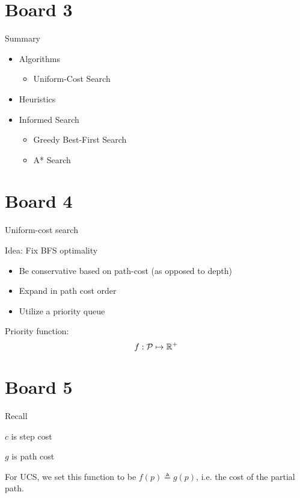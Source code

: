 \documentclass[10pt]{article}
\begin{document}
\section{Board 3}

Summary

\begin{itemize}
\item Algorithms
\begin{itemize}
\item Uniform-Cost Search 
\end{itemize}
\item Heuristics
\item Informed Search
  \begin{itemize}
  \item Greedy Best-First Search 
  \item A* Search
  \end{itemize}
\end{itemize}


\section{Board 4}

Uniform-cost search

Idea: Fix BFS optimality

\begin{itemize}
\item Be conservative based on path-cost (as opposed to depth)
\item Expand in path cost order
\item Utilize a priority queue
\end{itemize}

Priority function: \[f:\mathcal{P} \mapsto \mathbb{R}^+\]

\section{Board 5}

Recall 

$c$ is step cost 

$g$ is path cost


For UCS, we set this
function to be $f(p)\triangleq g(p)$, i.e. the cost of the partial
path.

\end{document}

